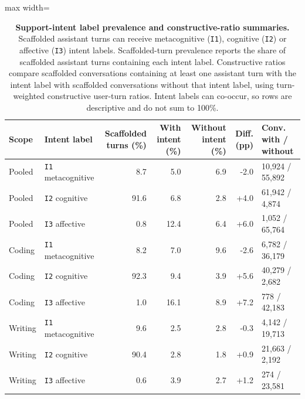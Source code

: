 \begin{table}[p]
\centering
\scriptsize
\caption{\textbf{Support-intent label prevalence and constructive-ratio summaries.} Scaffolded assistant turns can receive metacognitive (\texttt{I1}), cognitive (\texttt{I2}) or affective (\texttt{I3}) intent labels. Scaffolded-turn prevalence reports the share of scaffolded assistant turns containing each intent label. Constructive ratios compare scaffolded conversations containing at least one assistant turn with the intent label with scaffolded conversations without that intent label, using turn-weighted constructive user-turn ratios. Intent labels can co-occur, so rows are descriptive and do not sum to 100\%.}
\label{tab:support_intent_summary}
\begin{adjustbox}{max width=\textwidth}
\begin{tabular}{@{}llrrrrl@{}}
\toprule
Scope & Intent label & Scaffolded turns (\%) & With intent (\%) & Without intent (\%) & Diff. (pp) & Conv. with / without \\
\midrule
Pooled & \texttt{I1} metacognitive & 8.7 & 5.0 & 6.9 & -2.0 & 10,924 / 55,892 \\
Pooled & \texttt{I2} cognitive & 91.6 & 6.8 & 2.8 & +4.0 & 61,942 / 4,874 \\
Pooled & \texttt{I3} affective & 0.8 & 12.4 & 6.4 & +6.0 & 1,052 / 65,764 \\
\addlinespace
Coding & \texttt{I1} metacognitive & 8.2 & 7.0 & 9.6 & -2.6 & 6,782 / 36,179 \\
Coding & \texttt{I2} cognitive & 92.3 & 9.4 & 3.9 & +5.6 & 40,279 / 2,682 \\
Coding & \texttt{I3} affective & 1.0 & 16.1 & 8.9 & +7.2 & 778 / 42,183 \\
\addlinespace
Writing & \texttt{I1} metacognitive & 9.6 & 2.5 & 2.8 & -0.3 & 4,142 / 19,713 \\
Writing & \texttt{I2} cognitive & 90.4 & 2.8 & 1.8 & +0.9 & 21,663 / 2,192 \\
Writing & \texttt{I3} affective & 0.6 & 3.9 & 2.7 & +1.2 & 274 / 23,581 \\
\bottomrule
\end{tabular}
\end{adjustbox}
\end{table}
